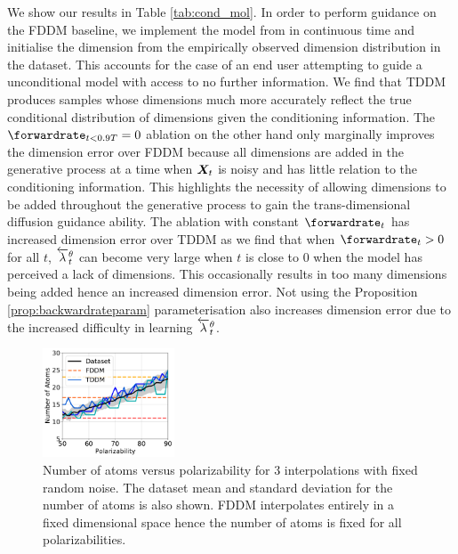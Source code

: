 We show our results in Table \ref{tab:cond_mol}. In order to perform guidance on the FDDM baseline, we implement the model from \cite{hoogeboom2022equivariant} in continuous time and initialise the dimension from the empirically observed dimension distribution in the dataset.  This accounts for the case of an end user attempting to guide a unconditional model with access to no further information. We find that TDDM produces samples whose dimensions much more accurately reflect the true conditional distribution of dimensions given the conditioning information.
The $\forwardrate_{t<0.9T} = 0$ ablation on the other hand only marginally improves the dimension error over FDDM because all dimensions are added in the generative process at a time when ${\bm{X}}_t$ is noisy and has little relation to the conditioning information. This highlights the necessity of allowing dimensions to be added throughout the generative process to gain the trans-dimensional diffusion guidance ability. The ablation with constant $\forwardrate_t$ has increased dimension error over TDDM as we find that when $\forwardrate_t > 0$ for all $t$, $\overleftarrow{\lambda}_t^\theta$ can become very large when $t$ is close to 0 when the model has perceived a lack of dimensions. This occasionally results in too many dimensions being added hence an increased dimension error. Not using the Proposition \ref{prop:backwardrateparam} parameterisation also increases dimension error due to the increased difficulty in learning $\overleftarrow{\lambda}_t^\theta$.

\begin{figure}
    \includegraphics[width=0.35\textwidth]{figs/tddm/polarizability_vs_num_atoms.pdf}
    \caption{Number of atoms versus polarizability for $3$ interpolations with fixed random noise. The dataset mean and standard deviation for the number of atoms is also shown.
    FDDM interpolates entirely in a fixed dimensional space hence the number of atoms is fixed for all polarizabilities.}
    \label{fig:tddm-interp_plot}
\end{figure}

